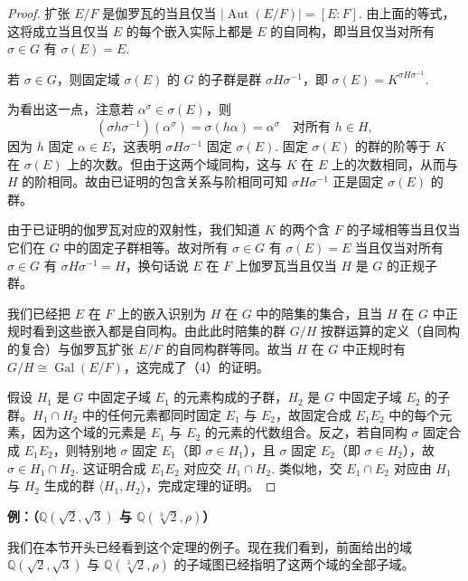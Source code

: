 \begin{proof}
扩张 \(E/F\) 是伽罗瓦的当且仅当 \(|\operatorname{Aut}(E/F)| = [E:F]\). 由上面的等式，这将成立当且仅当 \(E\) 的每个嵌入实际上都是 \(E\) 的自同构，即当且仅当对所有 \(\sigma \in G\) 有 \(\sigma(E) = E\).

若 \(\sigma \in G\)，则固定域 \(\sigma(E)\) 的 \(G\) 的子群是群 \(\sigma H\sigma^{-1}\)，即 \(\sigma(E) = K^{\sigma H\sigma^{-1}}\).

为看出这一点，注意若 \(\alpha^\sigma \in \sigma(E)\)，则
\[
(\sigma h\sigma^{-1})(\alpha^\sigma) = \sigma(h\alpha) = \alpha^\sigma \quad \text{对所有 } h \in H,
\]
因为 \(h\) 固定 \(\alpha \in E\)，这表明 \(\sigma H\sigma^{-1}\) 固定 \(\sigma(E)\). 固定 \(\sigma(E)\) 的群的阶等于 \(K\) 在 \(\sigma(E)\) 上的次数。但由于这两个域同构，这与 \(K\) 在 \(E\) 上的次数相同，从而与 \(H\) 的阶相同。故由已证明的包含关系与阶相同可知 \(\sigma H\sigma^{-1}\) 正是固定 \(\sigma(E)\) 的群。

由于已证明的伽罗瓦对应的双射性，我们知道 \(K\) 的两个含 \(F\) 的子域相等当且仅当它们在 \(G\) 中的固定子群相等。故对所有 \(\sigma \in G\) 有 \(\sigma(E) = E\) 当且仅当对所有 \(\sigma \in G\) 有 \(\sigma H\sigma^{-1} = H\)，换句话说 \(E\) 在 \(F\) 上伽罗瓦当且仅当 \(H\) 是 \(G\) 的正规子群。

我们已经把 \(E\) 在 \(F\) 上的嵌入识别为 \(H\) 在 \(G\) 中的陪集的集合，且当 \(H\) 在 \(G\) 中正规时看到这些嵌入都是自同构。由此此时陪集的群 \(G/H\) 按群运算的定义（自同构的复合）与伽罗瓦扩张 \(E/F\) 的自同构群等同。故当 \(H\) 在 \(G\) 中正规时有 \(G/H \cong \operatorname{Gal}(E/F)\)，这完成了（4）的证明。

假设 \(H_1\) 是 \(G\) 中固定子域 \(E_1\) 的元素构成的子群，\(H_2\) 是 \(G\) 中固定子域 \(E_2\) 的子群。\(H_1 \cap H_2\) 中的任何元素都同时固定 \(E_1\) 与 \(E_2\)，故固定合成 \(E_1E_2\) 中的每个元素，因为这个域的元素是 \(E_1\) 与 \(E_2\) 的元素的代数组合。反之，若自同构 \(\sigma\) 固定合成 \(E_1E_2\)，则特别地 \(\sigma\) 固定 \(E_1\)（即 \(\sigma \in H_1\)），且 \(\sigma\) 固定 \(E_2\)（即 \(\sigma \in H_2\)），故 \(\sigma \in H_1 \cap H_2\). 这证明合成 \(E_1E_2\) 对应交 \(H_1 \cap H_2\). 类似地，交 \(E_1 \cap E_2\) 对应由 \(H_1\) 与 \(H_2\) 生成的群 \(\langle H_1, H_2 \rangle\)，完成定理的证明。
\end{proof}

\noindent\textbf{例：（\(\mathbb{Q}(\sqrt{2}, \sqrt{3})\) 与 \(\mathbb{Q}(\sqrt[3]{2}, \rho)\)）}

我们在本节开头已经看到这个定理的例子。现在我们看到，前面给出的域 \(\mathbb{Q}(\sqrt{2}, \sqrt{3})\) 与 \(\mathbb{Q}(\sqrt[3]{2}, \rho)\) 的子域图已经指明了这两个域的全部子域。

